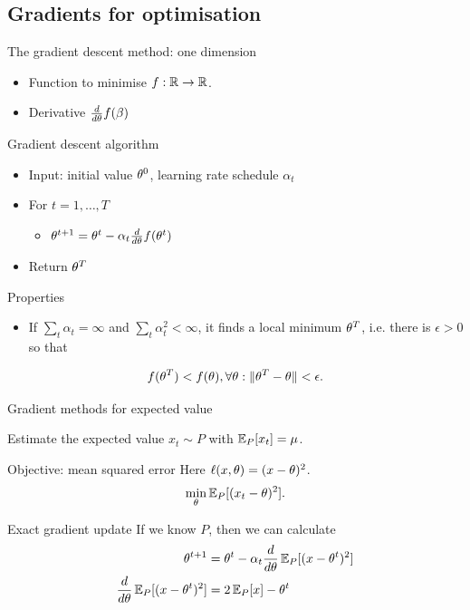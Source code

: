 \documentclass[smaller]{beamer}
\begin{document}
\subsection{Gradients for optimisation}
\label{sec:org9fbfa1e}
\begin{frame}[label={sec:orgc2cc2af}]{The gradient descent method: one dimension}
\begin{itemize}
\item Function to minimise \(f : \mathbb{R} \to \mathbb{R}\).
\item Derivative \(\frac{d}{d \theta} f(\beta)\)
\end{itemize}
\begin{block}{Gradient descent algorithm}
\begin{itemize}
\item Input: initial value \(\theta^0\), \alert{learning rate} schedule \(\alpha_t\)
\item For \(t=1, \ldots, T\)
\begin{itemize}
\item \(\theta^{t+1} = \theta^t - \alpha_t \frac{d}{d \theta} f(\theta^t)\)
\end{itemize}
\item Return \(\theta^T\)
\end{itemize}
\end{block}

\begin{block}{Properties}
\begin{itemize}
\item If \(\sum_t \alpha_t = \infty\) and \(\sum_t \alpha_t^2 < \infty\), it finds a local minimum \(\theta^T\), i.e. there is \(\epsilon > 0\) so that
\end{itemize}
\[
f(\theta^T) < f(\theta), \forall \theta: \|\theta^T - \theta\| < \epsilon.
\]
\end{block}
\end{frame}
\begin{frame}[label={sec:orgd4543de}]{Gradient methods for expected value}
\begin{block}{Estimate the expected value}
\(x_t \sim P\) with \(\mathop{\mbox{\ensuremath{\mathbb{E}}}}\nolimits_P[x_t] = \mu\).
\pause
\end{block}
\begin{block}{Objective: mean squared error}
Here \(\ell(x, \theta) = (x - \theta)^2\).
\[
\min_\theta \mathop{\mbox{\ensuremath{\mathbb{E}}}}\nolimits_P[(x_t - \theta)^2].
\]
\pause
\end{block}
\begin{block}{Exact gradient update}
If we know \(P\), then we can calculate
\begin{align}
\theta^{t+1} &= \theta^t - \alpha_t \frac{d}{d\theta} \mathop{\mbox{\ensuremath{\mathbb{E}}}}\nolimits_P[(x - \theta^t)^2]\\
\frac{d}{d\theta} \mathop{\mbox{\ensuremath{\mathbb{E}}}}\nolimits_P[(x - \theta^t)^2] &= 2 \mathop{\mbox{\ensuremath{\mathbb{E}}}}\nolimits_P[x] - \theta^t
\end{align}
\end{block}
\end{frame}
\end{document}
